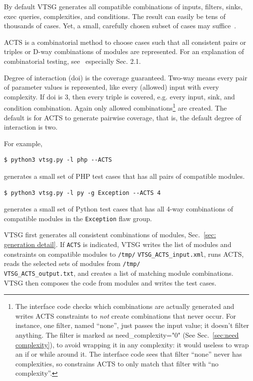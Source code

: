 By default VTSG generates all compatible combinations of inputs, filters, sinks,
exec queries, complexities, and conditions.  The result can easily be tens of
thousands of cases.  Yet, a small, carefully chosen subset of cases may
suffice~\cite{SWInteractions2004}.

ACTS is a combinatorial method to choose cases such that all consistent
pairs or triples or D-way combinations of modules are represented.  For an
explanation of combinatorial testing, see~\cite{KuhnEtAl2010PracCT} especially
Sec. 2.1.

Degree of interaction (doi) is the coverage guaranteed.  Two-way means every
pair of parameter values is represented, like every (allowed) input with every
complexity.  If doi is 3, then every triple is covered, e.g. every input, sink,
and condition combination.  Again only allowed combinations\footnote{The
interface code checks which combinations are actually generated and
writes ACTS constraints to \emph{not} create combinations that never occur.
For instance, one filter, named ``none'', just passes the input value; it
doesn't filter anything.  The filter is marked as need\_complexity="0" (See
Sec.~\ref{sec:need complexity}), to avoid wrapping it in any complexity: it
would useless to wrap an if or while around it.  The interface code sees that
filter ``none'' never has complexities, so constrains ACTS to only match that
filter with ``no complexity''.
}
are created.  The default is for ACTS to generate pairwise coverage, that is,
the default degree of interaction is two.

For example,
\begin{verbatim}
$ python3 vtsg.py -l php --ACTS
\end{verbatim}
generates a small set of PHP test cases that has all pairs of compatible
modules.
\begin{verbatim}
$ python3 vtsg.py -l py -g Exception --ACTS 4
\end{verbatim}
generates a small set of Python test cases that has all 4-way combinations of
compatible modules in the \verb|Exception| flaw group.

VTSG first generates all consistent combinations of modules,
Sec.~\ref{sec: generation detail}.  If \verb|ACTS| is indicated, VTSG writes
the list of modules and constraints on compatible modules to
\verb|/tmp/| \verb|VTSG_ACTS_input.xml|, runs ACTS, reads the selected sets of modules
from \verb|/tmp/| \\ \verb|VTSG_ACTS_output.txt|, and creates a list of matching module
combinations.  VTSG then composes the code from modules and writes the test
cases.

